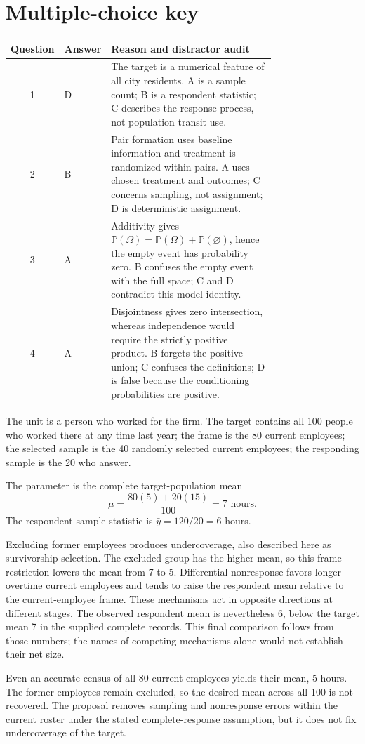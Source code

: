 \documentclass[11pt]{article}
\begin{document}
\section*{Multiple-choice key}
\begin{tabular}{clp{0.75\linewidth}}\toprule
Question & Answer & Reason and distractor audit \\\midrule
1 & D & The target is a numerical feature of all city residents. A is a sample count; B is a respondent statistic; C describes the response process, not population transit use. \\[5pt]
2 & B & Pair formation uses baseline information and treatment is randomized within pairs. A uses chosen treatment and outcomes; C concerns sampling, not assignment; D is deterministic assignment. \\[5pt]
3 & A & Additivity gives $\mathbb P(\Omega)=\mathbb P(\Omega)+\mathbb P(\varnothing)$, hence the empty event has probability zero. B confuses the empty event with the full space; C and D contradict this model identity. \\[5pt]
4 & A & Disjointness gives zero intersection, whereas independence would require the strictly positive product. B forgets the positive union; C confuses the definitions; D is false because the conditioning probabilities are positive. \\\bottomrule
\end{tabular}

\begin{parts}
\item The unit is a person who worked for the firm. The target contains all 100 people who worked there at any time last year; the frame is the 80 current employees; the selected sample is the 40 randomly selected current employees; the responding sample is the 20 who answer.
\item The parameter is the complete target-population mean
\[
\mu=\frac{80(5)+20(15)}{100}=7\text{ hours}.
\]
The respondent sample statistic is $\bar y=120/20=6$ hours.
\item Excluding former employees produces undercoverage, also described here as survivorship selection. The excluded group has the higher mean, so this frame restriction lowers the mean from 7 to 5. Differential nonresponse favors longer-overtime current employees and tends to raise the respondent mean relative to the current-employee frame. These mechanisms act in opposite directions at different stages. The observed respondent mean is nevertheless 6, below the target mean 7 in the supplied complete records. This final comparison follows from those numbers; the names of competing mechanisms alone would not establish their net size.
\item Even an accurate census of all 80 current employees yields their mean, 5 hours. The former employees remain excluded, so the desired mean across all 100 is not recovered. The proposal removes sampling and nonresponse errors within the current roster under the stated complete-response assumption, but it does not fix undercoverage of the target.
\end{parts}
\end{document}
